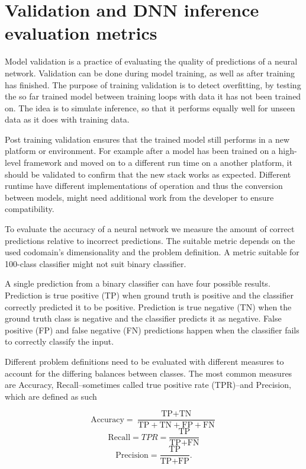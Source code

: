 \documentclass[12pt,a4paper,english
]{tunithesis}
\begin{document}
\section{Validation and DNN inference evaluation metrics}
Model validation is a practice of evaluating the quality of predictions of a neural network. Validation can be done during model training, as well as after training has finished. The purpose of training validation is to detect overfitting, by testing the so far trained model between training loops with data it has not been trained on. The idea is to simulate inference, so that it performs equally well for unseen data as it does with training data.

Post training validation ensures that the trained model still performs in a new platform or environment. For example after a model has been trained on a high-level framework and moved on to a different run time on a another platform, it should be validated to confirm that the new stack works as expected. Different runtime have different implementations of operation and thus the conversion between models, might need additional work from the developer to ensure compatibility.

To evaluate the accuracy of a neural network we measure the amount of correct predictions relative to incorrect predictions. The suitable metric depends on the used codomain's dimensionality and the problem definition. A metric suitable for 100-class classifier might not suit binary classifier.

A single prediction from a binary classifier can have four possible results. Prediction is true positive (TP) when ground truth is positive and the classifier correctly predicted it to be positive. Prediction is true negative (TN) when the ground truth class is negative and the classifier predicts it as negative. False positive (FP) and false negative (FN) predictions happen when the classifier fails to correctly classify the input.

Different problem definitions need to be evaluated with different measures to account for the differing balances between classes. The most common measures are Accuracy, Recall--sometimes called true positive rate (TPR)--and Precision, which are defined as such

\begin{equation}
\text{Accuracy} =  \frac{\text{TP} + \text{TN}}{\text{TP} + \text{TN} + \text{FP} + \text{FN}}
\end{equation}
\begin{equation}
\text{Recall} = TPR = \frac{\text{TP}}{\text{TP} + \text{FN}}
\end{equation}
\begin{equation}
\text{Precision} =  \frac{\text{TP}}{\text{TP} + \text{FP}}.
\end{equation}
\end{document}
